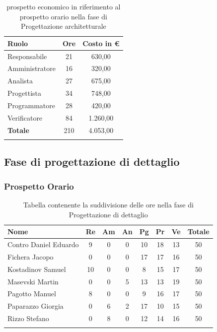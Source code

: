 \documentclass[../piano_di_progetto.tex]{subfiles}
\begin{document}
\begin{center}
	\begin{longtable}{|l|c|c|}
		\hline
		\rowcolor{lightgray}
		\textbf{Ruolo} & \textbf{Ore} & \textbf{Costo in €}\\

		\hline
		Responsabile & 21 & 630,00\\
		Amministratore & 16 & 320,00\\
		Analista & 27 & 675,00\\
		Progettista & 34 & 748,00\\
		Programmatore & 28 & 420,00\\
		Verificatore & 84 & 1.260,00\\
		\textbf{Totale} & 210 & 4.053,00\\
		\hline
		\rowcolor{white}
		\caption{prospetto economico in riferimento al prospetto orario nella fase di Progettazione architetturale}
	\end{longtable}
\end{center}

\subsection{ Fase di progettazione di dettaglio}%
\label{sub:fase_prog_dett}
\subsubsection{Prospetto Orario}

\begin{center}
	\begin{longtable}{|l|c|c|c|c|c|c|c|}
		\hline
		\rowcolor{lightgray}
		\textbf{Nome} & \textbf{Re} & \textbf{Am} & \textbf{An} & \textbf{Pg}  & \textbf{Pr}   & \textbf{Ve} & \textbf{Totale} \\

		\hline
			Contro Daniel Eduardo & 9 & 0 & 0 & 10 & 18 & 13 & 50 \\
			Fichera Jacopo & 0 & 0 & 0 & 17 & 17 & 16 & 50 \\
			Kostadinov Samuel & 10 & 0 & 0 & 8 & 15 & 17 & 50 \\	
			Masevski Martin & 0 & 0 & 5 & 13 & 13 & 19 & 50 \\
			Pagotto Manuel & 8 & 0 & 0 & 9 & 16 & 17 & 50 \\		
			Paparazzo Giorgia & 0 & 6 & 2 & 17 & 10 & 15 & 50 \\
			Rizzo Stefano & 0 & 8 & 0 & 12 & 14 & 16 & 50 \\
		\hline	
		\rowcolor{white}
		\caption{Tabella contenente la suddivisione delle ore nella fase di Progettazione di dettaglio}
	\end{longtable}
\end{center}
\end{document}
